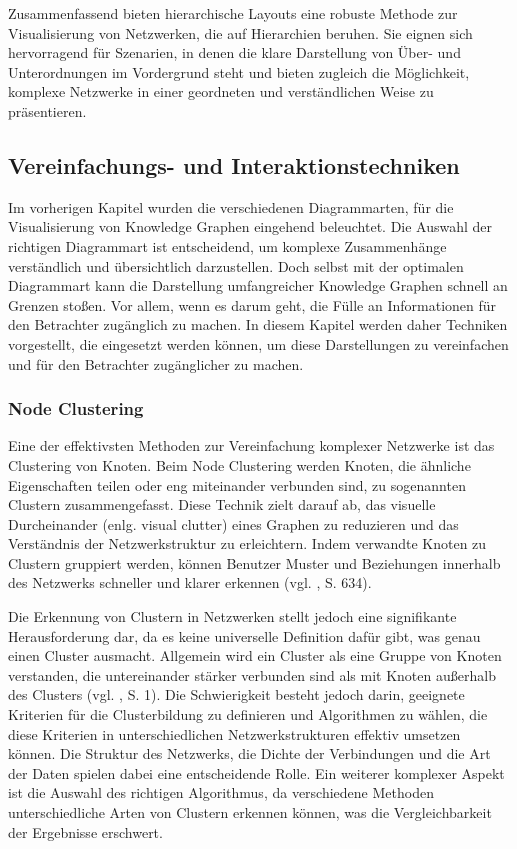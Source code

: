 Zusammenfassend bieten hierarchische Layouts eine robuste Methode zur Visualisierung von Netzwerken, die auf Hierarchien beruhen. Sie eignen sich hervorragend für Szenarien, in denen die klare Darstellung von Über- und Unterordnungen im Vordergrund steht und bieten zugleich die Möglichkeit, komplexe Netzwerke in einer geordneten und verständlichen Weise zu präsentieren.

\subsection{Vereinfachungs- und Interaktionstechniken}

Im vorherigen Kapitel wurden die verschiedenen Diagrammarten, für die Visualisierung von Knowledge Graphen eingehend beleuchtet. Die Auswahl der richtigen Diagrammart ist entscheidend, um komplexe Zusammenhänge verständlich und übersichtlich darzustellen. Doch selbst mit der optimalen Diagrammart kann die Darstellung umfangreicher Knowledge Graphen schnell an Grenzen stoßen. Vor allem, wenn es darum geht, die Fülle an Informationen für den Betrachter zugänglich zu machen. In diesem Kapitel werden daher Techniken vorgestellt, die eingesetzt werden können, um diese Darstellungen zu vereinfachen und für den Betrachter zugänglicher zu machen.

\subsubsection{Node Clustering}

Eine der effektivsten Methoden zur Vereinfachung komplexer Netzwerke ist das Clustering von Knoten. Beim Node Clustering werden Knoten, die ähnliche Eigenschaften teilen oder eng miteinander verbunden sind, zu sogenannten Clustern zusammengefasst. Diese Technik zielt darauf ab, das visuelle Durcheinander (enlg. visual clutter) eines Graphen zu reduzieren und das Verständnis der Netzwerkstruktur zu erleichtern. Indem verwandte Knoten zu Clustern gruppiert werden, können Benutzer Muster und Beziehungen innerhalb des Netzwerks schneller und klarer erkennen (vgl. \cite{chen:SurveyGraphVisualization}, S. 634).

Die Erkennung von Clustern in Netzwerken stellt jedoch eine signifikante Herausforderung dar, da es keine universelle Definition dafür gibt, was genau einen Cluster ausmacht. Allgemein wird ein Cluster als eine Gruppe von Knoten verstanden, die untereinander stärker verbunden sind als mit Knoten außerhalb des Clusters (vgl. \cite{clustering:AlgosForClust}, S. 1). Die Schwierigkeit besteht jedoch darin, geeignete Kriterien für die Clusterbildung zu definieren und Algorithmen zu wählen, die diese Kriterien in unterschiedlichen Netzwerkstrukturen effektiv umsetzen können. Die Struktur des Netzwerks, die Dichte der Verbindungen und die Art der Daten spielen dabei eine entscheidende Rolle. Ein weiterer komplexer Aspekt ist die Auswahl des richtigen Algorithmus, da verschiedene Methoden unterschiedliche Arten von Clustern erkennen können, was die Vergleichbarkeit der Ergebnisse erschwert.

